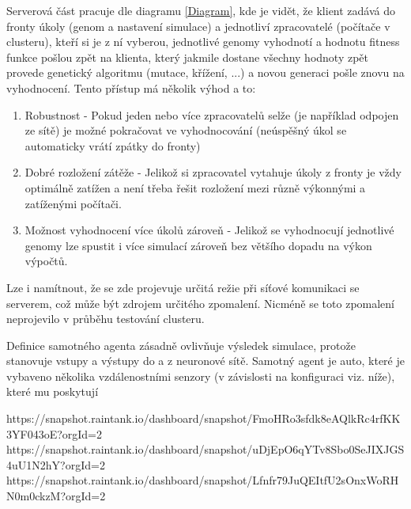 Serverová část pracuje dle diagramu \ref{Diagram}, kde je vidět, že klient zadává do fronty úkoly (genom a nastavení simulace) a jednotliví zpracovatelé (počítače v clusteru), kteří si je z ní vyberou, jednotlivé genomy vyhodnotí a hodnotu fitness funkce pošlou zpět na klienta, který jakmile dostane všechny hodnoty zpět provede genetický algoritmu (mutace, křížení, ...) a novou generaci pošle znovu na vyhodnocení.
Tento přístup má několik výhod a to:
\begin{enumerate}
	\item Robustnost - Pokud jeden nebo více zpracovatelů selže (je například odpojen ze sítě) je možné pokračovat ve vyhodnocování (neúspěšný úkol se automaticky vrátí zpátky do fronty)
	\item Dobré rozložení zátěže - Jelikož si zpracovatel vytahuje úkoly z fronty je vždy optimálně zatížen a není třeba řešit rozložení mezi různě výkonnými a zatíženými počítači.
	\item Možnost vyhodnocení více úkolů zároveň - Jelikož se vyhodnocují jednotlivé genomy lze spustit i více simulací zároveň bez většího dopadu na výkon výpočtů.
\end{enumerate}

Lze i namítnout, že se zde projevuje určitá režie při síťové komunikaci se serverem, což může být zdrojem určitého zpomalení. Nicméně se toto zpomalení neprojevilo v průběhu testování clusteru.


Definice samotného agenta zásadně ovlivňuje výsledek simulace, protože stanovuje vstupy a výstupy do a z neuronové sítě. 
Samotný agent je auto, které je vybaveno několika vzdálenostními senzory (v závislosti na konfiguraci viz. níže), které mu poskytují 

https://snapshot.raintank.io/dashboard/snapshot/FmoHRo3sfdk8eAQlkRc4rfKK3YF043oE?orgId=2
https://snapshot.raintank.io/dashboard/snapshot/uDjEpO6qYTv8Sbo0SeJIXJGS4uU1N2hY?orgId=2
https://snapshot.raintank.io/dashboard/snapshot/Lfnfr79JuQEItfU2sOnxWoRHN0m0ckzM?orgId=2
